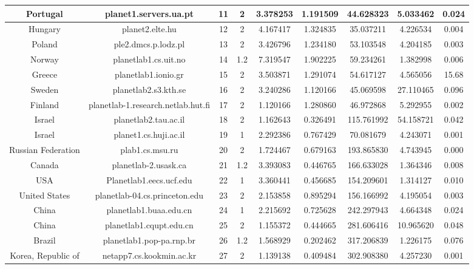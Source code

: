 \begin{longtable}{c c c c c c c c c}
        Portugal & planet1.servers.ua.pt                & 11  &  2 &3.378253&1.191509&44.628323&5.033462&0.024\\\hline
        Hungary & planet2.elte.hu                       & 12  &  2 &4.167417&1.324835&35.037211&4.226534&0.004\\\hline
        Poland & ple2.dmcs.p.lodz.pl                    & 13  &  2 &3.426796&1.234180&53.103548&4.204185&0.003\\\hline
        Norway & planetlab1.cs.uit.no                   & 14  &1.2 &7.319547&1.902225&59.234261&1.382998&0.006\\\hline
        Greece & planetlab1.ionio.gr                    & 15  &  2 &3.503871&1.291074&54.617127&4.565056&15.68\\\hline
        Sweden & planetlab2.s3.kth.se                   & 16  &  2 &3.240286&1.120166&45.069598&27.110465&0.096\\\hline
        Finland & planetlab-1.research.netlab.hut.fi    & 17  &  2 &1.120166&1.280860&46.972868&5.292955&0.002\\\hline
        Israel & planetlab2.tau.ac.il                   & 18  &  2 &1.162643&0.326491&115.761992&54.158721&0.042\\\hline
        Israel & planet1.cs.huji.ac.il                  & 19  &  1 &2.292386&0.767429&70.081679&4.243071&0.001\\\hline
        Russian Federation & plab1.cs.msu.ru            & 20  &  2 &1.724467&0.679163&193.865830&4.743945&0.000\\\hline
        Canada & planetlab-2.usask.ca                   & 21  &1.2 &3.393083&0.446765&166.633028&1.364346&0.008\\\hline
        USA & Planetlab1.eecs.ucf.edu                   & 22  &  1 &3.360441&0.456685&154.209601&1.314127&0.010\\\hline
        United States & planetlab-04.cs.princeton.edu   & 23  &  2 &2.153858&0.895294&156.166992&4.195054&0.003\\\hline
        China & planetlab1.buaa.edu.cn                  & 24  &  1 &2.215692&0.725628&242.297943&4.664348&0.024\\\hline
        China & planetlab1.cqupt.edu.cn                 & 25  &  2 &1.155372&0.444665&281.606416&10.965620&0.048\\\hline
        Brazil & planetlab1.pop-pa.rnp.br               & 26  &1.2 &1.568929&0.202462&317.206839&1.226175&0.076\\\hline
        Korea, Republic of & netapp7.cs.kookmin.ac.kr   & 27  &  2 &1.139138&0.409484&302.908380&4.257230&0.001\\\hline

\end{longtable}
